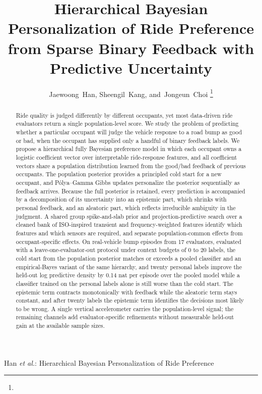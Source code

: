 \documentclass[lettersize,journal]{IEEEtran}
\newif\ifdraftnotes
\newcommand{\draftnote}[1]{\ifdraftnotes\textcolor{red}{\textbf{[TODO: #1]}}\fi}
\begin{document}
\title{Hierarchical Bayesian Personalization of Ride Preference from Sparse Binary Feedback with Predictive Uncertainty}

\author{Jaewoong~Han,
        Sheengil~Kang,
        and~Jongeun~Choi%
\thanks{\draftnote{Affiliations, corresponding author, funding, and manuscript dates.}}}

%
{Han \MakeLowercase{\textit{et al.}}: Hierarchical Bayesian Personalization of Ride Preference}

\maketitle

\begin{abstract}
Ride quality is judged differently by different occupants, yet most data-driven ride evaluators return a single population-level score. We study the problem of predicting whether a particular occupant will judge the vehicle response to a road bump as good or bad, when the occupant has supplied only a handful of binary feedback labels. We propose a hierarchical fully Bayesian preference model in which each occupant owns a logistic coefficient vector over interpretable ride-response features, and all coefficient vectors share a population distribution learned from the good/bad feedback of previous occupants. The population posterior provides a principled cold start for a new occupant, and P\'{o}lya--Gamma Gibbs updates personalize the posterior sequentially as feedback arrives. Because the full posterior is retained, every prediction is accompanied by a decomposition of its uncertainty into an epistemic part, which shrinks with personal feedback, and an aleatoric part, which reflects irreducible ambiguity in the judgment. A shared group spike-and-slab prior and projection-predictive search over a cleaned bank of ISO-inspired transient and frequency-weighted features identify which features and which sensors are required, and separate population-common effects from occupant-specific effects. On real-vehicle bump episodes from 17 evaluators, evaluated with a leave-one-evaluator-out protocol under context budgets of 0 to 20 labels, the cold start from the population posterior matches or exceeds a pooled classifier and an empirical-Bayes variant of the same hierarchy, and twenty personal labels improve the held-out log predictive density by 0.14 nat per episode over the pooled model while a classifier trained on the personal labels alone is still worse than the cold start. The epistemic term contracts monotonically with feedback while the aleatoric term stays constant, and after twenty labels the epistemic term identifies the decisions most likely to be wrong. A single vertical accelerometer carries the population-level signal; the remaining channels add evaluator-specific refinements without measurable held-out gain at the available sample sizes.
\end{abstract}
\end{document}
